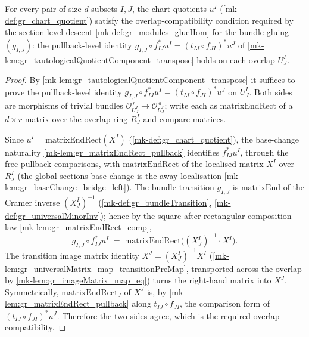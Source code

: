 \begin{lemma}\label{mk-lem:gr_tautologicalQuotient_overlap}
  \leanok

  For every pair of size-\(d\) subsets \(I, J\), the chart quotients \(u^I\)
  (\ref{mk-def:gr_chart_quotient}) satisfy the overlap-compatibility condition required by the
  section-level descent \ref{mk-def:gr_modules_glueHom} for the bundle gluing \((g_{I,J})\):
  the pullback-level identity \(g_{I,J} \circ f_{IJ}^{*} u^I = (t_{IJ}\circ f_{JI})^{*} u^J\)
  of \ref{mk-lem:gr_tautologicalQuotientComponent_transpose} holds on each overlap \(U^I_J\).
\end{lemma}
\begin{proof}
  By \ref{mk-lem:gr_tautologicalQuotientComponent_transpose} it suffices to prove the
  pullback-level identity \(g_{I,J} \circ f_{IJ}^{*} u^I = (t_{IJ}\circ f_{JI})^{*} u^J\) on
  \(U^I_J\). Both sides are morphisms of trivial bundles \(\mathcal{O}_{U^I_J}^{\,r} \to
  \mathcal{O}_{U^I_J}^{\,d}\); write each as \(\mathrm{matrixEndRect}\) of a \(d \times r\)
  matrix over the overlap ring \(R^I_J\) and compare matrices.

  Since \(u^I = \mathrm{matrixEndRect}(X^I)\) (\ref{mk-def:gr_chart_quotient}), the
  base-change naturality \ref{mk-lem:gr_matrixEndRect_pullback} identifies \(f_{IJ}^{*} u^I\),
  through the free-pullback comparisons, with \(\mathrm{matrixEndRect}\) of the localised
  matrix \(X^I\) over \(R^I_J\) (the global-sections base change is the away-localisation
  \ref{mk-lem:gr_baseChange_bridge_left}). The bundle transition \(g_{I,J}\) is
  \(\mathrm{matrixEnd}\) of the Cramer inverse \((X^I_J)^{-1}\)
  (\ref{mk-def:gr_bundleTransition}, \ref{mk-def:gr_universalMinorInv}); hence by the
  square-after-rectangular composition law \ref{mk-lem:gr_matrixEndRect_comp},
  \[
    g_{I,J} \circ f_{IJ}^{*} u^I
      \;=\; \mathrm{matrixEndRect}\bigl((X^I_J)^{-1} \cdot X^I\bigr).
  \]
  The transition image matrix identity \(X^J = (X^I_J)^{-1} X^I\)
  (\ref{mk-lem:gr_universalMatrix_map_transitionPreMap}, transported across the overlap by
  \ref{mk-lem:gr_imageMatrix_map_eq}) turns the right-hand matrix into \(X^J\). Symmetrically,
  \(\mathrm{matrixEndRect}_J\) of \(X^J\) is, by \ref{mk-lem:gr_matrixEndRect_pullback} along
  \(t_{IJ}\circ f_{JI}\), the comparison form of \((t_{IJ}\circ f_{JI})^{*} u^J\). Therefore
  the two sides agree, which is the required overlap compatibility.
\end{proof}

